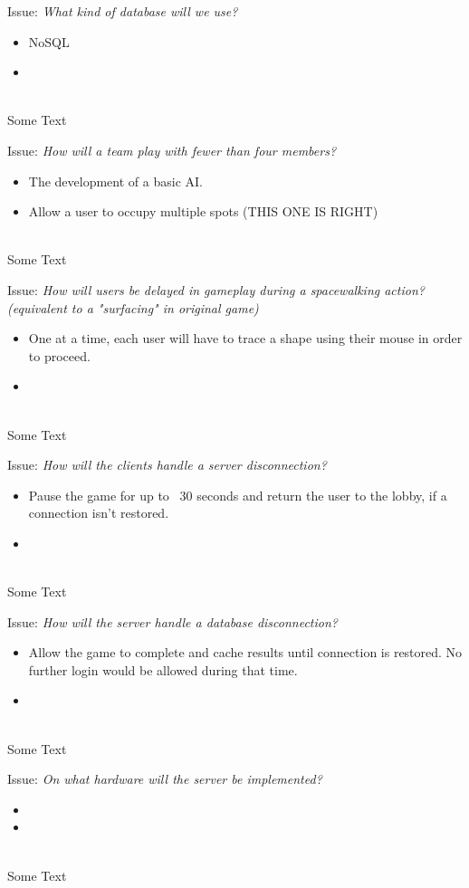 Issue: \textit{What kind of database will we use?}
\\
  \begin{itemize}
    \item NoSQL
    \item 
  \end{itemize}
\\
Some Text

Issue: \textit{How will a team play with fewer than four members?}
\\
  \begin{itemize}
    \item The development of a basic AI.
    \item Allow a user to occupy multiple spots (THIS ONE IS RIGHT)
  \end{itemize}
\\
Some Text

Issue: \textit{How will users be delayed in gameplay during a spacewalking action? (equivalent to a "surfacing" in original game)}
\\
  \begin{itemize}
    \item One at a time, each user will have to trace a shape using their mouse in order to proceed.
    \item 
  \end{itemize}
\\
Some Text

Issue: \textit{How will the clients handle a server disconnection?}
\\
  \begin{itemize}
    \item Pause the game for up to ~30 seconds and return the user to the lobby, if a connection isn't restored.
    \item 
  \end{itemize}
\\
Some Text

Issue: \textit{How will the server handle a database disconnection?}
\\
  \begin{itemize}
    \item Allow the game to complete and cache results until connection is restored. No further login would be allowed during that time.
    \item 
  \end{itemize}
\\
Some Text

Issue: \textit{On what hardware will the server be implemented?}
\\
  \begin{itemize}
    \item 
    \item 
  \end{itemize}
\\
Some Text
